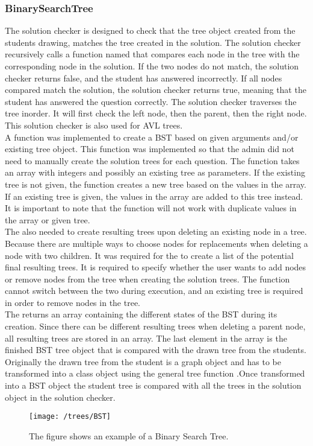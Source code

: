 \subsubsection{BinarySearchTree}
The solution checker is designed to check that the tree object created from the students drawing, matches the tree created in the solution. The solution checker recursively calls a function named  that compares each node in the tree with the corresponding node in the solution. If the two nodes do not match, the solution checker returns false, and the student has answered incorrectly. If all nodes compared match the solution, the solution checker returns true, meaning that the student has answered the question correctly. The solution checker traverses the tree inorder. It will first check the left node, then the parent, then the right node. This solution checker is also used for AVL trees.
\\[11pt]
A function  was implemented to create a BST based on given arguments and/or existing tree object. This function was implemented so that the admin did not need to manually create the solution trees for each question. The function takes an array with integers and possibly an existing tree as parameters. If the existing tree is not given, the function creates a new tree based on the values in the array. If an existing tree is given, the values in the array are added to this tree instead. It is important to note that the function will not work with duplicate values in the array or given tree.
\\[11pt]
The  also needed to create resulting trees upon deleting an existing node in a tree. Because there are multiple ways to choose nodes for replacements when deleting a node with two children. It was required for the  to create a list of the potential final resulting trees. It is required to specify whether the user wants to add nodes or remove nodes from the tree when creating the solution trees. The function cannot switch between the two during execution, and an existing tree is required in order to remove nodes in the tree.\cite{BinaryTree}
\\[11pt]
The  returns an array containing the different states of the BST during its creation. Since there can be different resulting trees when deleting a parent node, all resulting trees are stored in an array. The last element in the array is the finished BST tree object that is compared with the drawn tree from the students. Originally the drawn tree from the student is a graph object and has to be transformed into a  class object using the general tree function .Once transformed into a BST object the student tree is compared with all the trees in the solution object in the solution checker.
\begin{figure}[H]
    \centering
    \texttt{[image: /trees/BST]}
    \caption{The figure shows an example of a Binary Search Tree.}    
    \label{fig:BST}
\end{figure}